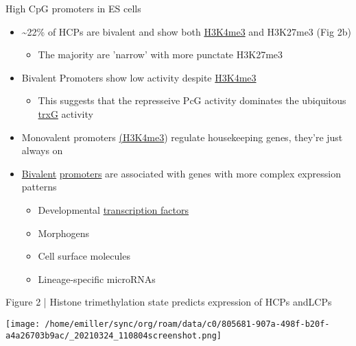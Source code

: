 \documentclass[bigger]{beamer}
\begin{document}
\begin{frame}[label={sec:org06f563f}]{High CpG promoters in ES cells}
\begin{itemize}
\item \textasciitilde{}22\% of HCPs are bivalent and show both \href{../../concepts/biology/h3k4me3.org}{H3K4me3} and H3K27me3 (Fig 2b)
\begin{itemize}
\item The majority are 'narrow' with more punctate H3K27me3
\end{itemize}

\item Bivalent Promoters show low activity despite \href{../../concepts/biology/h3k4me3.org}{H3K4me3}
\begin{itemize}
\item This suggests that the represseive PcG activity dominates the ubiquitous \href{../../concepts/biology/trxg.org}{trxG} activity
\end{itemize}

\item Monovalent promoters \href{../../concepts/biology/h3k4me3.org}{(H3K4me3}) regulate housekeeping genes, they're just always on
\item \href{../../concepts/biology/bivalent\_chromatin.org}{Bivalent} \href{../../concepts/biology/promoter.org}{promoters} are associated with genes with more complex expression
patterns
\begin{itemize}
\item Developmental \href{../../concepts/biology/transcription\_factor\_tf.org}{transcription factors}
\item Morphogens
\item Cell surface molecules
\item Lineage-specific microRNAs
\end{itemize}
\end{itemize}
\end{frame}

\begin{frame}[label={sec:org50e451d}]{Figure 2 | Histone trimethylation state predicts expression of HCPs andLCPs}
\begin{center}
\texttt{[image: /home/emiller/sync/org/roam/data/c0/805681-907a-498f-b20f-a4a26703b9ac/\_20210324\_110804screenshot.png]}
\end{center}
\end{frame}
\end{document}

